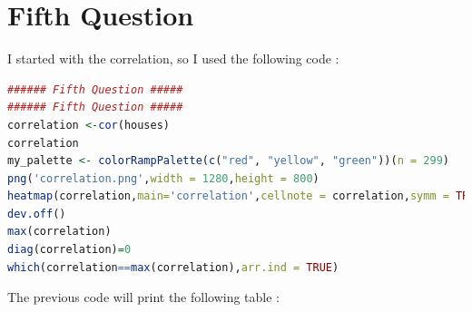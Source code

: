 \documentclass{article}
\begin{document}
\section*{Fifth Question}
I started with the correlation, so I used the following code : 
\begin{lstlisting}[language=R]
###### Fifth Question #####
###### Fifth Question #####
correlation <-cor(houses)
correlation
my_palette <- colorRampPalette(c("red", "yellow", "green"))(n = 299)
png('correlation.png',width = 1280,height = 800)
heatmap(correlation,main='correlation',cellnote = correlation,symm = TRUE,col=my_palette)
dev.off()
max(correlation)
diag(correlation)=0
which(correlation==max(correlation),arr.ind = TRUE)
\end{lstlisting}
The previous code will print the following table : \\
\end{document}
